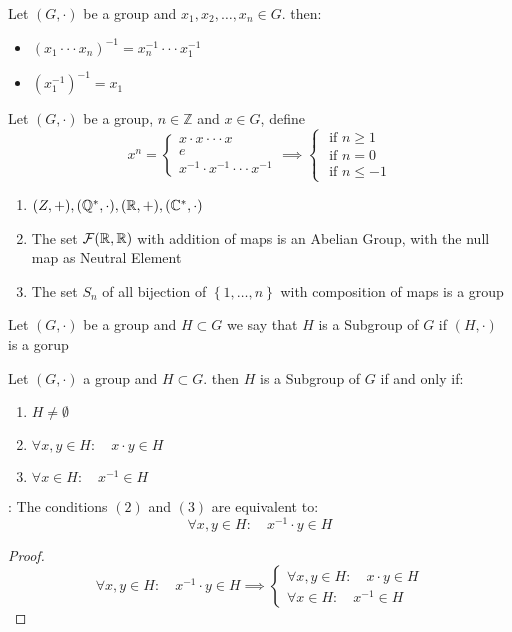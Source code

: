 \exercise Let $(G, \cdot )  $ be a group and $x_1, x_2, \hdots , x_{n} \in G $. then: 
\begin{itemize}
\item  $(x_1 \cdot \cdot  \cdot x_{n}) ^{-1} = x_{n}^{-1} \cdot \cdot \cdot x_1^{-1}$
\item  $(x_1^{-1}) ^{-1} = x_1$
\end{itemize}

\begin{definition}[]
Let $(G, \cdot )  $  be a group, $n \in \mathbb{Z} $ and $x \in  G $, define 
\[
x^n = \begin{cases}
x \cdot x \cdot \cdot \cdot x 
\\
e\\
x^{-1} \cdot  x^{-1} \cdot \cdot \cdot x^{-1}
\end{cases}
\implies 
\begin{cases}
\text{ if } n \geq 1 \\
\text{ if } n = 0 \\
\text{ if } n \leq -1
\end{cases}
\]
\end{definition}
\begin{example}
\begin{enumerate}
\item $(Z, +), (\mathbb{Q}^{*}, \cdot ), (\mathbb{R} , +), (\mathbb{C}^{*}, \cdot)$ 
 \item The set $\mathcal{F} (\mathbb{R} , \mathbb{R} )  $  with addition of maps is an Abelian Group, with the null map
   as Neutral Element
  \item The set $S_{n} $ of all bijection of $\left\{ 1, \hdots , n \right\} $  with composition 
    of maps is a group 
\end{enumerate}
\end{example}
\begin{definition}
  Let $(G, \cdot )$ be a group and $H \subset G$ we say that $H $ is a Subgroup of $G $  if 
  $(H, \cdot )  $ is a gorup
\end{definition}

\begin{proposition}
  
  Let $(G, \cdot )  $  a group and $H \subset G $. then $H $ is a Subgroup of $G $ if and only if:
  \begin{enumerate}
  \item $H \neq \emptyset  $ 
    \item $ \forall x,y \in  H: \quad x \cdot  y \in  H $  
      \item $\forall x \in  H: \quad x^{-1} \in  H $  
  \end{enumerate}
\end{proposition}
\underline{}: The conditions $(2)  $  and $(3)  $ are equivalent to:
\[
\forall x,y \in H: \quad x^{-1} \cdot  y \in  H 
\]
\begin{proof}
\[
\forall x,y \in H: \quad x^{-1}\cdot y \in  H \implies 
\begin{cases}
\forall x,y \in  H: \quad x \cdot  y \in  H \\
\forall x \in  H: \quad x^{-1} \in  H
\end{cases}
\]
\end{proof}
